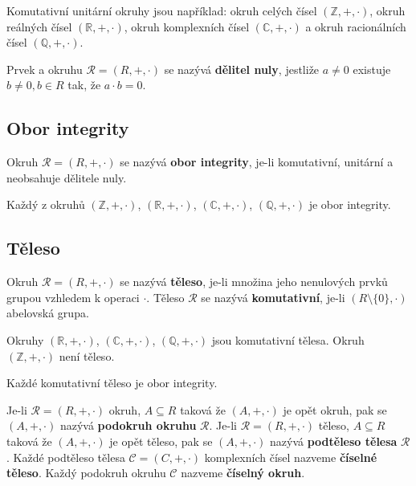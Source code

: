 \begin{example}
	Komutativní unitární okruhy jsou například: okruh celých čísel $(\mathbb{Z}, + , \cdot)$, okruh reálných čísel $(\mathbb{R}, + , \cdot)$, okruh komplexních čísel $(\mathbb{C}, + , \cdot)$ a okruh racionálních čísel $(\mathbb{Q}, + , \cdot)$.
\end{example}

\begin{definition}
	Prvek a okruhu $\mathscr{R} = (R,+,\cdot)$ se nazývá \textbf{dělitel nuly}, jestliže $a \not= 0$ existuje $b \not= 0, b \in R$ tak, že $a \cdot b = 0$.
\end{definition}

\subsection{Obor integrity}
\begin{definition}
	Okruh $\mathscr{R} = (R,+,\cdot)$ se nazývá \textbf{obor integrity}, je-li komutativní, unitární a neobsahuje dělitele nuly.
\end{definition}

\begin{example}
	Každý z okruhů $(\mathbb{Z}, + , \cdot)$, $(\mathbb{R}, + , \cdot)$,  $(\mathbb{C}, + , \cdot)$, $(\mathbb{Q}, + , \cdot)$ je obor integrity.
\end{example}


\subsection{Těleso}
\begin{definition}
	Okruh $\mathscr{R} = (R,+,\cdot)$ se nazývá \textbf{těleso}, je-li množina jeho nenulových prvků grupou vzhledem k operaci $\cdot$. Těleso $\mathscr{R}$ se nazývá \textbf{komutativní}, je-li $(R \setminus \{0\}, \cdot)$ abelovská grupa.
\end{definition}

\begin{example}
	Okruhy  $(\mathbb{R}, + , \cdot)$,  $(\mathbb{C}, + , \cdot)$, $(\mathbb{Q}, + , \cdot)$ jsou komutativní tělesa. Okruh $(\mathbb{Z}, + , \cdot)$ není těleso.
\end{example}

\begin{sentence}
	Každé komutativní těleso je obor integrity.
\end{sentence}

\begin{definition}
	Je-li  $\mathscr{R} = (R,+,\cdot)$ okruh, $A \subseteq R$ taková že  $(A,+,\cdot)$ je opět okruh, pak se    $(A,+,\cdot)$ nazývá \textbf{podokruh okruhu} $\mathscr{R}$. Je-li  $\mathscr{R} = (R,+,\cdot)$ těleso, $A \subseteq R$ taková že  $(A,+,\cdot)$ je opět těleso, pak se $(A,+,\cdot)$ nazývá \textbf{podtěleso tělesa} $\mathscr{R}$. Každé podtěleso tělesa $\mathscr{C} = (C,+,\cdot)$  komplexních čísel nazveme \textbf{číselné těleso}. Každý podokruh okruhu  $\mathscr{C}$ nazveme \textbf{číselný okruh}.
\end{definition}

